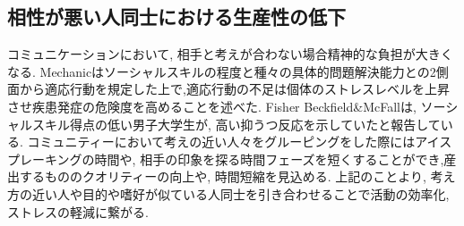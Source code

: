 
\subsection{相性が悪い人同士における生産性の低下}
コミュニケーションにおいて, 相手と考えが合わない場合精神的な負担が大きくなる.
Mechanicはソーシャルスキルの程度と種々の具体的問題解決能力との2側面から適応行動を規定した上で,適応行動の不足は個体のストレスレベルを上昇させ疾患発症の危険度を高めることを述べた.\cite{Mechanic}
Fisher Beckfield\&McFallは, ソーシャルスキル得点の低い男子大学生が, 高い抑うつ反応を示していたと報告している.\cite{FisherMcFall}
コミュニティーにおいて考えの近い人々をグルーピングをした際にはアイスプレーキングの時間や, 相手の印象を探る時間フェーズを短くすることができ,産出するもののクオリティーの向上や, 時間短縮を見込める.
上記のことより, 考え方の近い人や目的や嗜好が似ている人同士を引き合わせることで活動の効率化, ストレスの軽減に繋がる.





